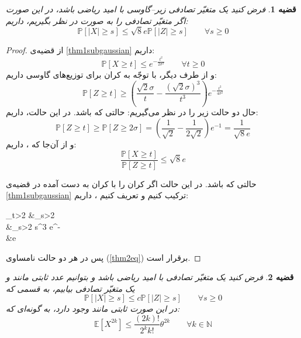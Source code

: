 \documentclass[a4paper,12pt]{article}
\newtheorem{thm}{{\large\bf قضیه}}[section]
\newcommand{\E}{\mathbb{E}}
\newcommand{\Prob}{\mathbb{P}}
\newcommand{\Nd}{\mathcal{N}}
\begin{document}
	\begin{thm}\label{thm2subgaussian}
		فرض کنید 
		یک متغیّر تصادفی زیر--گاوسی با امید ریاضی
		\lr{$\E[X]=0$}
		باشد، در این صورت اگر متغیّر تصادفی 
		را به صورت
		\lr{$Z\sim \Nd(0,2\sigma^2)$}
		در نظر بگیریم، داریم:
		\begin{equation}
		\Prob[|X|\geq s] \leq \sqrt{8}e \Prob[|Z|\geq s] \qquad \forall s \geq 0
		\label{thm2eq}
		\end{equation}
	\end{thm}
	\begin{proof}
		از قضیه‌ی
		\ref{thm1subgaussian}
		داریم:
		\[\Prob[X\geq t] \leq e^{-\frac{t^2}{2\sigma^2}}\qquad \forall t\geq0\]
		و از طرف دیگر، با توجّه به کران
		برای توزیع‌های گاوسی داریم:
		\[\Prob[Z\geq t] \geq\left(\frac{\sqrt{2}\sigma}{t} - \frac{(\sqrt{2}\sigma)^3}{t^3} \right) e^{-\frac{t^2}{4\sigma^2}}\]
		حال دو حالت زیر را در نظر می‌گیریم:	
		حالتی که 
		باشد. در این حالت، داریم:
		\[\Prob[Z\geq t] \geq \Prob[Z\geq 2\sigma] = \left(\frac{1}{\sqrt{2}} - \frac{1}{2\sqrt{2}} \right) e^{-1} = \frac{1}{\sqrt{8}e}\]
		و از آن‌جا که
		\lr{$\Prob[X\geq t] \leq 1$}،
		داریم:
		\[\frac{\Prob[X\geq t]}{\Prob[Z\geq t]} \leq \sqrt{8}e\]
		
		
		حالتی که
		باشد. در این حالت اگر کران
		را با کران به دست آمده در قضیه‌ی
		\ref{thm1subgaussian}
		ترکیب کنیم و تعریف کنیم
		،
		داریم:
		\begin{flalign*}
		\sup_{t>2\sigma} \frac{\Prob[X\geq t]}{\Prob[Z\geq t]} &\leq \sup_{s>2}\\
		&\leq \sup_{s>2} s^3 e^{-}\\
		&\leq {}e
		\end{flalign*}
		پس در هر دو حالت نامساوی
		(\ref{thm2eq})
		برقرار است.		
	\end{proof}
	\begin{thm}\label{thm3subgaussian}
		فرض کنید 
		یک متغیّر تصادفی با امید ریاضی
		\lr{$\E[X]=0$}
		باشد و بتوانیم عدد ثابتی مانند
		و یک متغیّر تصادفی
		\lr{$Z\sim\Nd(0,\tau^2)$}
		بیابیم، به قسمی که
		\begin{equation}
		\Prob[|X|\geq s] \leq c \Prob[|Z|\geq s] \qquad \forall s \geq 0
		\end{equation}
		در این صورت ثابتی مانند
		وجود دارد، به گونه‌ای که:
		\begin{equation}
		\E\left[X^{2k}\right] \leq \frac{(2k)!}{2^kk!}\theta^{2k}\qquad \forall k \in \mathbb{N}
		\end{equation}
	\end{thm}
\end{document}
